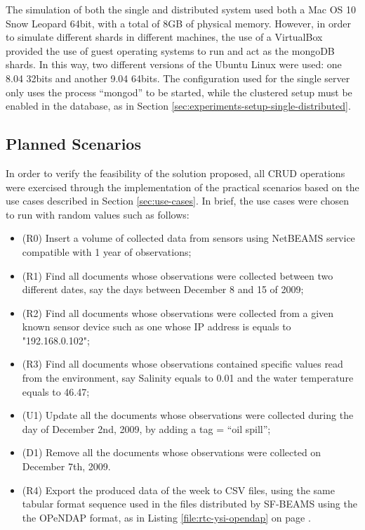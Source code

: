 The simulation of both the single and distributed system used both a Mac OS 10
Snow Leopard 64bit, with a total of 8GB of physical memory. However, in order
to simulate different shards in different machines, the use of a VirtualBox
\cite{virtualization} provided the use of guest operating systems to run and
act as the mongoDB shards. In this way, two different versions of the Ubuntu
Linux were used: one 8.04 32bits and another 9.04 64bits. The configuration
used for the single server only uses the process ``mongod'' to be started,
while the clustered setup must be enabled in the database, as in Section
\ref{sec:experiments-setup-single-distributed}.

\subsection{Planned Scenarios}
\label{sec:exp-scenarios}

In order to verify the feasibility of the solution proposed, all CRUD
operations were exercised through the implementation of the practical
scenarios based on the use cases described in Section \ref{sec:use-cases}. In
brief, the use cases were chosen to run with random values such as follows:

\begin{itemize}
  \item (R0) Insert a volume of collected data from sensors using NetBEAMS
  service compatible with 1 year of observations;
  \item (R1) Find all documents whose observations were collected between two
  different dates, say the days between December 8 and 15 of 2009;
  \item (R2) Find all documents whose observations were collected from a given
  known sensor device such as one whose IP address is equals to "192.168.0.102";
  \item (R3) Find all documents whose observations contained specific values
  read from the environment, say Salinity equals to 0.01 and the water temperature
  equals to 46.47;
  \item (U1) Update all the documents whose observations were collected during
  the day of December 2nd, 2009, by adding a tag = ``oil spill'';
  \item (D1) Remove all the documents whose observations were collected on
  December 7th, 2009.
  \item (R4) Export the produced data of the week to CSV files, using the same
  tabular format sequence used in the files distributed by SF-BEAMS using the 
  the OPeNDAP format, as in Listing \ref{file:rtc-ysi-opendap} on page
  \pageref{file:rtc-ysi-opendap}.
\end{itemize}

